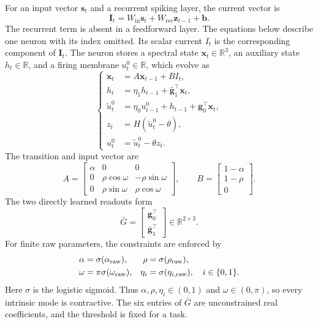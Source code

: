 \documentclass[letterpaper,journal]{IEEEtran}
\newcommand{\R}{\mathbb{R}}
\begin{document}
For an input vector $\mathbf{s}_t$ and a recurrent spiking layer, the current vector is
\begin{equation}
\mathbf I_t=W_{\mathrm{in}}\mathbf s_t+
W_{\mathrm{rec}}\mathbf z_{t-1}+\mathbf b.
\label{eq:current}
\end{equation}
The recurrent term is absent in a feedforward layer. The equations below describe one neuron with its index omitted. Its scalar current $I_t$ is the corresponding component of $\mathbf I_t$. The neuron stores a spectral state $\mathbf x_t\in\R^3$, an auxiliary state $h_t\in\R$, and a firing membrane $u_t^0\in\R$, which evolve as
\begin{equation}
\left\{
\begin{aligned}
\mathbf x_t&=A\mathbf x_{t-1}+BI_t,\\
h_t&=\eta_1h_{t-1}+\bar{\mathbf g}_1^\top\mathbf x_t,\\
\widetilde u_t^0&=\eta_0u_{t-1}^0+h_{t-1}
                    +\mathbf g_0^\top\mathbf x_t,\\
z_t&=H(\widetilde u_t^0-\theta),\\
u_t^0&=\widetilde u_t^0-\theta z_t.
\end{aligned}
\right.
\label{eq:sprif}
\end{equation}
The transition and input vector are
\begin{equation}
A=\begin{bmatrix}
\alpha&0&0\\
0&\rho\cos\omega&-\rho\sin\omega\\
0&\rho\sin\omega&\rho\cos\omega
\end{bmatrix},
\qquad
B=\begin{bmatrix}1-\alpha\\1-\rho\\0\end{bmatrix}.
\label{eq:AB}
\end{equation}
The two directly learned readouts form
\begin{equation}
\bar G=
\begin{bmatrix}\mathbf g_0^\top\\\bar{\mathbf g}_1^\top\end{bmatrix}
\in\R^{2\times3}.
\label{eq:G}
\end{equation}
For finite raw parameters, the constraints are enforced by
\begin{equation}
\begin{aligned}
\alpha&=\sigma(\alpha_{\rm raw}),&
\rho&=\sigma(\rho_{\rm raw}),\\
\omega&=\pi\sigma(\omega_{\rm raw}),&
\eta_i&=\sigma(\eta_{i,{\rm raw}}),\quad i\in\{0,1\}.
\end{aligned}
\label{eq:constraints}
\end{equation}
Here $\sigma$ is the logistic sigmoid. Thus $\alpha,\rho,\eta_i\in(0,1)$ and $\omega\in(0,\pi)$, so every intrinsic mode is contractive. The six entries of $\bar G$ are unconstrained real coefficients, and the threshold is fixed for a task.
\end{document}
